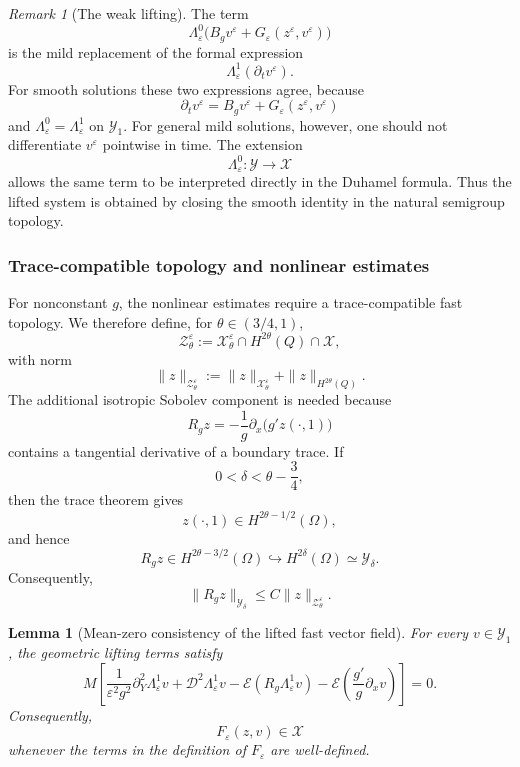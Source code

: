 \documentclass[11pt]{article}
\newtheorem{lemma}[theorem]{Lemma}
\theoremstyle{definition}
\theoremstyle{remark}
\newtheorem{remark}[theorem]{Remark}
\numberwithin{equation}{section}
\newcommand{\mc}[1]{\mathcal{#1}}
\begin{document}
\begin{remark}[The weak lifting]
The term
\[
\Lambda_\varepsilon^0\bigl(B_gv^\varepsilon
+G_\varepsilon(z^\varepsilon,v^\varepsilon)\bigr)
\]
is the mild replacement of the formal expression
\[
\Lambda_\varepsilon^1(\partial_t v^\varepsilon).
\]
For smooth solutions these two expressions agree, because
\[
\partial_t v^\varepsilon
=
B_gv^\varepsilon+G_\varepsilon(z^\varepsilon,v^\varepsilon)
\]
and \(\Lambda_\varepsilon^0=\Lambda_\varepsilon^1\) on \(\mathcal Y_1\).
For general mild solutions, however, one should not differentiate
\(v^\varepsilon\) pointwise in time. The extension
\[
\Lambda_\varepsilon^0:\mathcal Y\to\mathcal X
\]
allows the same term to be interpreted directly in the Duhamel formula.
Thus the lifted system is obtained by closing the smooth identity in the
natural semigroup topology.
\end{remark}


\subsubsection*{Trace-compatible topology and nonlinear estimates}
\label{subsubsec:thin-domain-trace-compatible-topology}

For nonconstant \(g\), the nonlinear estimates require a trace-compatible fast
topology. We therefore define, for \(\theta\in(3/4,1)\),
\[
\mc Z_\theta^\varepsilon
:=
\mathcal X_\theta^\varepsilon
\cap H^{2\theta}(Q)\cap\mathcal X,
\]
with norm
\[
\|z\|_{\mc Z_\theta^\varepsilon}
:=
\|z\|_{\mathcal X_\theta^\varepsilon}
+
\|z\|_{H^{2\theta}(Q)}.
\]
The additional isotropic Sobolev component is needed because
\[
R_gz=-\frac1g\partial_x\bigl(g'z(\cdot,1)\bigr)
\]
contains a tangential derivative of a boundary trace. If
\[
0<\delta<\theta-\frac34,
\]
then the trace theorem gives
\[
z(\cdot,1)\in H^{2\theta-1/2}(\Omega),
\]
and hence
\[
R_gz\in H^{2\theta-3/2}(\Omega)
\hookrightarrow H^{2\delta}(\Omega)
\simeq\mathcal Y_\delta.
\]
Consequently,
\[
\|R_gz\|_{\mathcal Y_\delta}
\le
C\|z\|_{\mc Z_\theta^\varepsilon}.
\]

\begin{lemma}[Mean-zero consistency of the lifted fast vector field]
For every \(v\in \mc Y_1\), the geometric lifting terms satisfy
\[
M\left[
 \frac{1}{\varepsilon^2g^2}\partial_Y^2\Lambda_\varepsilon^1v
 +\mc D^2\Lambda_\varepsilon^1v
 -\mc E(R_g\Lambda_\varepsilon^1v)
 -\mc E\left(\frac{g'}{g}\partial_xv\right)
\right]=0.
\]
Consequently,
\[
F_\varepsilon(z,v)\in\mc X
\]
whenever the terms in the definition of \(F_\varepsilon\) are well-defined.

\end{lemma}
\end{document}
